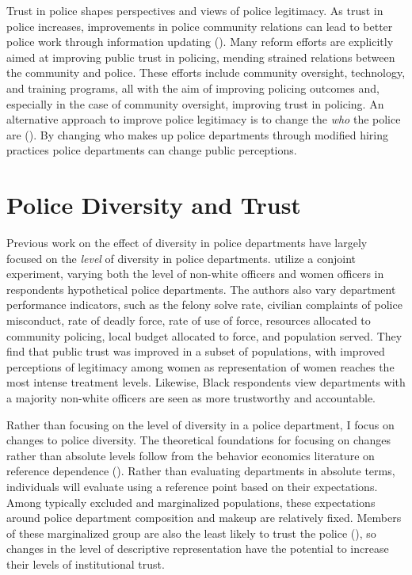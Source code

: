 \documentclass[12pt]{article}
\begin{document}
Trust in police shapes perspectives and views of police legitimacy. As trust in police increases, improvements in police community relations can lead to better police work through information updating (\cite{mccall_resident_2019}). Many reform efforts are explicitly aimed at improving public trust in policing, mending strained relations between the community and police. These efforts include community oversight, technology, and training programs, all with the aim of improving policing outcomes and, especially in the case of community oversight, improving trust in policing. An alternative approach to improve police legitimacy is to change the \textit{who} the police are (\cite{meier2006gender, nicholson2017will}). By changing who makes up police departments through modified hiring practices police departments can change public perceptions.

\section{Police Diversity and Trust}

Previous work on the effect of diversity in police departments have largely focused on the \textit{level} of diversity in police departments. \cite{stauffer2023police} utilize a conjoint experiment, varying both the level of non-white officers and women officers in respondents hypothetical police departments. The authors also vary department performance indicators, such as the felony solve rate, civilian complaints of police misconduct, rate of deadly force, rate of use of force, resources allocated to community policing, local budget allocated to force, and population served. They find that public trust was improved in a subset of populations, with improved perceptions of legitimacy among women as representation of women reaches the most intense treatment levels. Likewise, Black respondents view departments with a majority non-white officers are seen as more trustworthy and accountable.

Rather than focusing on the level of diversity in a police department, I focus on changes to police diversity. The theoretical foundations for focusing on changes rather than absolute levels follow from the behavior economics literature on reference dependence (\cite{kHoszegi2006model}). Rather than evaluating departments in absolute terms, individuals will evaluate using a reference point based on their expectations. Among typically excluded and marginalized populations, these expectations around police department composition and makeup are relatively fixed. Members of these marginalized group are also the least likely to trust the police (\cite{stauffer2023police}), so changes in the level of descriptive representation have the potential to increase their levels of institutional trust.
\end{document}
